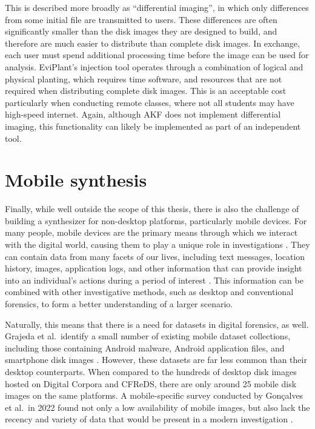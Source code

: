 This is described more broadly as ``differential imaging'', in which
only differences from some initial file are transmitted to users. These
differences are often significantly smaller than the disk images they
are designed to build, and therefore are much easier to distribute than
complete disk images. In exchange, each user must spend additional
processing time before the image can be used for analysis. EviPlant's
injection tool operates through a combination of logical and physical
planting, which requires time software, and resources that are not
required when distributing complete disk images. This is an acceptable
cost particularly when conducting remote classes, where not all students
may have high-speed internet. Again, although AKF does not implement
differential imaging, this functionality can likely be implemented as
part of an independent tool.

\section{Mobile synthesis}\label{mobile-synthesis}

Finally, while well outside the scope of this thesis, there is also the
challenge of building a synthesizer for non-desktop platforms,
particularly mobile devices. For many people, mobile devices are the
primary means through which we interact with the digital world, causing
them to play a unique role in investigations
\cite{chernyshevMobileForensicsAdvances2017}. They can contain data
from many facets of our lives, including text messages, location
history, images, application logs, and other information that can
provide insight into an individual's actions during a period of interest
\cite{sutiknoCapabilitiesCellebriteUniversal2024}. This information
can be combined with other investigative methods, such as desktop and
conventional forensics, to form a better understanding of a larger
scenario.

Naturally, this means that there is a need for datasets in digital
forensics, as well. Grajeda et al.~identify a small number of existing
mobile dataset collections, including those containing Android malware,
Android application files, and smartphone disk images
\cite{grajedaAvailabilityDatasetsDigital2017}. However, these
datasets are far less common than their desktop counterparts. When
compared to the hundreds of desktop disk images hosted on Digital
Corpora and CFReDS, there are only around 25 mobile disk images on the
same platforms. A mobile-specific survey conducted by Gonçalves et
al.~in 2022 found not only a low availability of mobile images, but also
lack the recency and variety of data that would be present in a modern
investigation \cite{goncalvesRevisitingDatasetGap2022}.


